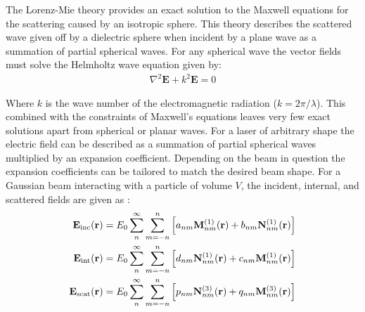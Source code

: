 The Lorenz-Mie theory provides an exact solution to the Maxwell 
equations for the scattering caused by an isotropic sphere. This 
theory describes the scattered wave given off by a dielectric 
sphere when incident by a plane wave as a summation of partial 
spherical waves. For any spherical wave the vector fields must 
solve the Helmholtz wave equation given by:
\begin{align}
	\nabla^2\mathbf{E} +k^2\mathbf{E} = 0
\end{align} 

Where $k$ is the wave number of the electromagnetic radiation 
($k = 2\pi/\lambda$). This combined with the constraints of 
Maxwell's equations leaves very few exact solutions apart from 
spherical or planar waves. For a laser of arbitrary shape the 
electric field can be described as a summation of partial 
spherical waves multiplied by an expansion coefficient. Depending 
on the beam in question the expansion coefficients can be tailored
to match the desired beam shape. For a Gaussian beam interacting 
with a particle of volume $V$, the incident, internal, and 
scattered fields are given as \cite{RanhaNeves2019}: 
\begin{align}
	\label{eq:incident}
	{\bf E}_{\rm inc}({\bf r})
	&=
	E_0 \sum_{n}^\infty\sum_{m=-n}^n \left[
	a_{nm}{\bf M}_{nm}^{(1)}({\bf r})
	+ b_{nm}{\bf N}_{nm}^{(1)}({\bf r})\right]
	\\
	\label{eq:internal}
	{\bf E}_{\rm int}({\bf r})
	&=
	E_0 \sum_{n}^\infty \sum_{m=-n}^{n}\left[
	d_{nm}{\bf N}_{nm}^{(1)}({\bf r}) + c_{nm}{\bf M}_{nm}^{(1)}({\bf r})
	\right]
	\\
	\label{eq:scattered}
	{\bf E}_{\rm scat}({\bf r})
	&=
	E_0 \sum_{n}^\infty \sum_{m=-n}^n\left[
	p_{nm}{\bf N}_{nm}^{(3)}({\bf r})+q_{nm}{\bf M}_{nm}^{(3)}({\bf r})
	\right] 
\end{align}

